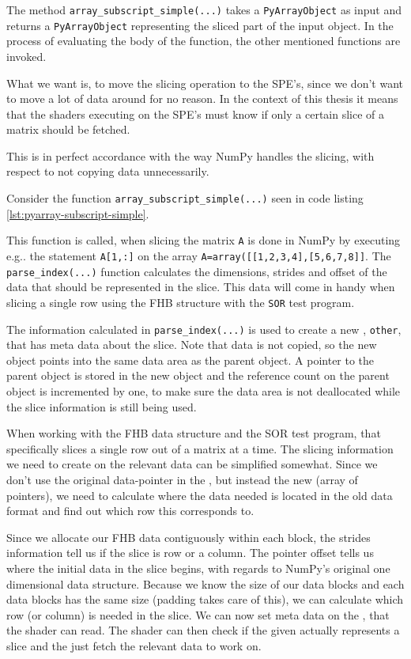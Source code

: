 The method \texttt{array\_subscript\_simple(...)} takes a \texttt{PyArrayObject} as
input and returns a \texttt{PyArrayObject} representing the sliced part of the
input object. In the process of evaluating the body of the function,
the other mentioned functions are invoked.

What we want is, to move the slicing operation to the SPE's, since we
don't want to move a lot of data around for no reason. In the context
of this thesis it means that the shaders executing on the SPE's must
know if only a certain slice of a matrix should be fetched.

This is in perfect accordance with the way NumPy handles the slicing,
with respect to not copying data unnecessarily.

Consider the function \texttt{array\_subscript\_simple(...)} seen in code listing \ref{lst:pyarray-subscript-simple}.

This function is called, when slicing the matrix \texttt{A} is done in
NumPy by executing e.g.. the statement \texttt{A[1,:]} on the
array \texttt{A=array([[1,2,3,4],[5,6,7,8]]}.
The \texttt{parse\_index(...)} function calculates the dimensions,
strides and offset of the data that should be represented in the
slice. This data will come in handy when slicing a single row using
the FHB structure with the \texttt{SOR} test program.

The information calculated in \texttt{parse\_index(...)} is used to
create a new , \texttt{other}, that has meta
data about the slice. Note that data is not copied, so the new object
points into the same data area as the parent object. A pointer to the
parent object is stored in the new object and the reference count on
the parent object is incremented by one, to make sure the data area is
not deallocated while the slice information is still being used.

When working with the FHB data structure and the SOR test program,
that specifically slices a single row out of a matrix at a time. The
slicing information we need to create on the relevant data can be
simplified somewhat. Since we don't use the original data-pointer in
the , but instead the
new (array of pointers), we need to calculate where
the data needed is located in the old data format and find out which
row this corresponds to.

Since we allocate our FHB data contiguously within each block, the
strides information tell us if the slice is row or a column. The
pointer offset tells us where the initial data in the slice begins,
with regards to NumPy's original one dimensional data
structure. Because we know the size of our data blocks and each data
blocks has the same size (padding takes care of this), we can
calculate which row (or column) is needed in the slice. We can now
set meta data on the
, that the shader can read. The shader can then check if
the given  actually represents a slice and the
just fetch the relevant data to work on.

